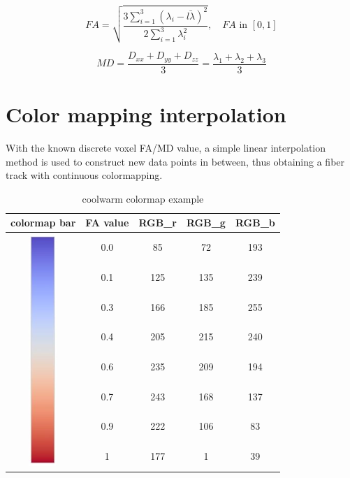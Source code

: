\documentclass[a4paper, 12pt]{report}
\begin{document}
\begin{equation*}
	FA=\sqrt{\frac{3 \sum_{i=1}^{3}(\lambda_i-\bar{l\lambda})^2}{2\sum_{i=1}^3\lambda_i^2}}, \quad FA\text{ in } [0,1]
\end{equation*}

\begin{equation*}
	MD=\frac{D_{xx}+D_{yy}+D_{zz}}{3}= \frac{\lambda_1+\lambda_2+\lambda_3}{3}
\end{equation*}

\section{ Color mapping interpolation }
With the known discrete voxel FA/MD value, a simple linear interpolation method is used to construct new data points in between, thus obtaining a fiber track with continuous colormapping.

\begin{table}[h]
\caption{coolwarm colormap example}
\centering
\begin{tabular}{|c|c|c|c|c|}
\hline
colormap bar     & FA value & RGB\_r & RGB\_g & RGB\_b   \\ \hline
\multirow{8}{*}{\includegraphics{coolwarm_bar} } & 0.0      & 85     & 72     & 193      \\ [5pt] \cline{2-5}
	& 0.1      & 125    & 135    & 239      \\ [6pt] \cline{2-5}
	& 0.3      & 166    & 185    & 255      \\ [6pt] \cline{2-5}
	& 0.4      & 205    & 215    & 240      \\ [6pt] \cline{2-5}
	& 0.6      & 235    & 209    & 194      \\ [6pt] \cline{2-5}
	& 0.7      & 243    & 168    & 137      \\ [6pt] \cline{2-5}
	& 0.9      & 222    & 106    & 83       \\ [6pt] \cline{2-5}
	& 1        & 177    & 1      & 39      \\ [6pt] \hline
\end{tabular}
\label{tbl:coolwarm}
\end{table}
\end{document}
